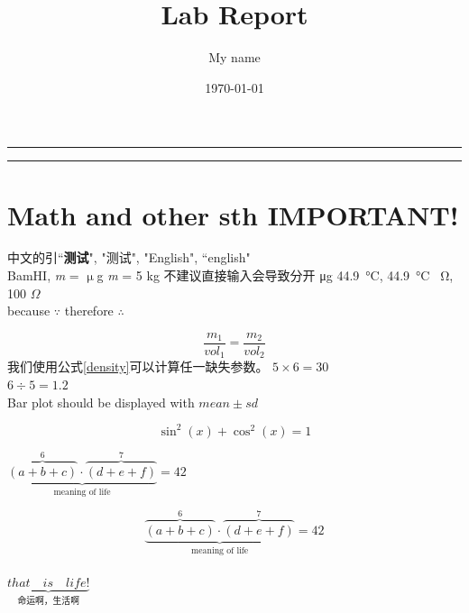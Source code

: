 \documentclass[a4paper,11pt]{ctexart}
\title{\textbf{Lab Report}} %
\author{My name}
\date{\today} %
\begin{document}
\maketitle





\noindent
\rule{\textwidth}{1pt}
\begin{abstract}
\zhlipsum[2]
\end{abstract}
\rule{\textwidth}{1pt}
\thispagestyle{empty}
\newpage

\tableofcontents
\thispagestyle{empty}

\clearpage
\setcounter{page}{1}
\section{Math and other sth IMPORTANT!}
中文的引\cite{RN865}``\textbf{测试}", "测试", "English", ``english"\\
BamHI, \textit{m} = $\upmu$g \textit{m} = 5 kg 不建议直接输入会导致分开 μg
\SI{44.9}{\celsius}, \SI{44.9}{\celsius} \SI{}{\ohm}, 100 $\Omega$\\
because $\because$ therefore $\therefore$

\begin{equation}
\frac{m_1}{vol_1}=\frac{m_2}{vol_2}
\label{density}
\end{equation}
我们使用公式\eqref{density}可以计算任一缺失参数。%
$5\times6 = 30$\\
$6\div5 = 1.2$\\
Bar plot should be displayed with $mean \pm sd$ \par%

\begin{equation}
\sin^2(x)+\cos^2(x) =1
\end{equation}

$\underbrace{\overbrace{(a+b+c)}^6
\cdot  \overbrace{(d+e+f)}^7}
_\text{meaning  of  life}  =  42$

$$\underbrace{\overbrace{(a+b+c)}^6
\cdot  \overbrace{(d+e+f)}^7}
_\text{meaning  of  life}  =  42$$\\
$\underbrace{that\quad is\quad life!}_\text{命运啊，生活啊}$
\end{document}
